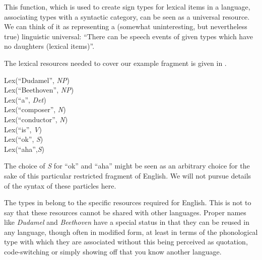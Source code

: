 This function, which is used to create sign types for lexical items in a
language, associating types with a syntactic category, can be seen as
a universal resource.  We can think of it as representing a (somewhat
uninteresting, but nevertheless true) linguistic universal:  ``There
can be speech events of given types which have 
no daughters (lexical items)''.  
  
   

The lexical resources needed to cover our example
fragment is given in \nexteg{}.
\begin{ex} 
Lex(``Dudamel'', \textit{NP}) \\
Lex(``Beethoven'', \textit{NP}) \\
Lex(``a'', \textit{Det}) \\
Lex(``composer'', \textit{N}) \\
Lex(``conductor'', \textit{N}) \\
Lex(``is'', \textit{V}) \\
Lex(``ok'', \textit{S}) \\
Lex(``aha'',\textit{S})
\label{ex:gramlexres} 
\end{ex}
The choice of \textit{S} for ``ok'' and ``aha'' might be seen as an
arbitrary choice for the sake of this particular restricted fragment
of English.  We will not pursue details of the syntax of these
particles here.

The types in \preveg{} belong to the specific resources required for
English. This is not to say that these resources cannot be shared with
other languages.  Proper names like \textit{Dudamel} and
\textit{Beethoven} have a special status in that they can be reused in
any language, though often in modified form, at least in terms of the
phonological type with which they are associated without this being
perceived as quotation, code-switching or simply showing off that you
know another language. 

